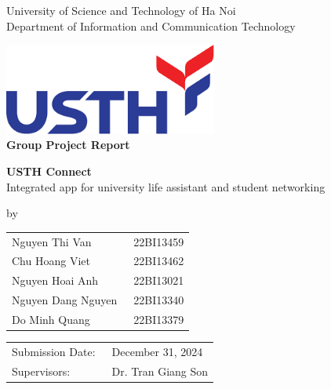 \begin{center}
\thispagestyle{empty}
\LARGE{University of Science and Technology of Ha Noi}\\[-0.9ex]
\large{Department of Information and Communication Technology}\\
\vspace{0.3cm}
\begin{center}
\includegraphics[width=7cm]{image/logoUSTH.png}\\
\vspace{0.9cm}
\textbf{\LARGE{Group Project Report}}\\
\medskip\par
\vspace{1.2cm}
\Large{\textbf{USTH Connect}}\\[-0.5ex]
\large{Integrated app for university life assistant and student networking}\\[-1.5ex]
\bigskip\par
by \par

\begin{tabular}{ll}
  Nguyen Thi Van &\ 22BI13459\\
  Chu Hoang Viet &\ 22BI13462\\
  Nguyen Hoai Anh &\ 22BI13021\\
  Nguyen Dang Nguyen &\ 22BI13340\\
  Do Minh Quang &\ 22BI13379\\
\end{tabular}
\vspace{0.6cm}
\end{center}
\medskip
\end{center}
\begin{tabular}{ll}
  Submission Date:  &\ December 31, 2024  \\[-1ex]
  Supervisors: &\ Dr. Tran Giang Son\\
\end{tabular}
